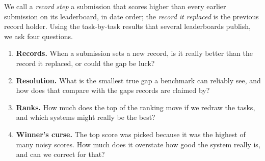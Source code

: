\documentclass[11pt]{article}
\begin{document}
We call a \emph{record step} a submission that scores higher than every earlier submission on its leaderboard, in date order; the \emph{record it replaced} is the previous record holder.
Using the task-by-task results that several leaderboards publish, we ask four questions.
\begin{enumerate}
\item \textbf{Records.} When a submission sets a new record, is it really better than the record it replaced, or could the gap be luck?
\item \textbf{Resolution.} What is the smallest true gap a benchmark can reliably see, and how does that compare with the gaps records are claimed by?
\item \textbf{Ranks.} How much does the top of the ranking move if we redraw the tasks, and which systems might really be the best?
\item \textbf{Winner's curse.} The top score was picked because it was the highest of many noisy scores. How much does it overstate how good the system really is, and can we correct for that?
\end{enumerate}
\end{document}

